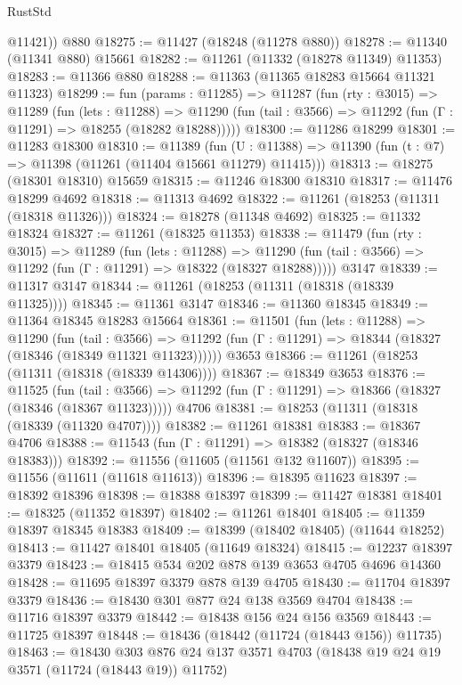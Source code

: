 \begin{lexlean}{RustStd}
\begin{coremodule}
        @11421))
    @880
@18275 := @11427 (@18248 (@11278 @880))
@18278 := @11340 (@11341 @880) @15661
@18282 := @11261 (@11332 (@18278 @11349) @11353)
@18283 := @11366 @880
@18288 := @11363 (@11365 @18283 @15664 @11321 @11323)
@18299 := fun (params : @11285) =>
  @11287
    (fun (rty : @3015) =>
    @11289
      (fun (lets : @11288) =>
      @11290 (fun (tail : @3566) => @11292 (fun (Γ : @11291) => @18255 (@18282 @18288)))))
@18300 := @11286 @18299
@18301 := @11283 @18300
@18310 := @11389
    (fun (U : @11388) => @11390 (fun (t : @7) => @11398 (@11261 (@11404 @15661 @11279) @11415)))
@18313 := @18275 (@18301 @18310) @15659
@18315 := @11246 @18300 @18310
@18317 := @11476 @18299 @4692
@18318 := @11313 @4692
@18322 := @11261 (@18253 (@11311 (@18318 @11326)))
@18324 := @18278 (@11348 @4692)
@18325 := @11332 @18324
@18327 := @11261 (@18325 @11353)
@18338 := @11479
    (fun (rty : @3015) =>
    @11289
      (fun (lets : @11288) =>
      @11290 (fun (tail : @3566) => @11292 (fun (Γ : @11291) => @18322 (@18327 @18288)))))
    @3147
@18339 := @11317 @3147
@18344 := @11261 (@18253 (@11311 (@18318 (@18339 @11325))))
@18345 := @11361 @3147
@18346 := @11360 @18345
@18349 := @11364 @18345 @18283 @15664
@18361 := @11501
    (fun (lets : @11288) =>
    @11290
      (fun (tail : @3566) =>
      @11292 (fun (Γ : @11291) => @18344 (@18327 (@18346 (@18349 @11321 @11323))))))
    @3653
@18366 := @11261 (@18253 (@11311 (@18318 (@18339 @14306))))
@18367 := @18349 @3653
@18376 := @11525
    (fun (tail : @3566) => @11292 (fun (Γ : @11291) => @18366 (@18327 (@18346 (@18367 @11323)))))
    @4706
@18381 := @18253 (@11311 (@18318 (@18339 (@11320 @4707))))
@18382 := @11261 @18381
@18383 := @18367 @4706
@18388 := @11543 (fun (Γ : @11291) => @18382 (@18327 (@18346 @18383)))
@18392 := @11556 (@11605 (@11561 @132 @11607))
@18395 := @11556 (@11611 (@11618 @11613))
@18396 := @18395 @11623
@18397 := @18392 @18396
@18398 := @18388 @18397
@18399 := @11427 @18381
@18401 := @18325 (@11352 @18397)
@18402 := @11261 @18401
@18405 := @11359 @18397 @18345 @18383
@18409 := @18399 (@18402 @18405) (@11644 @18252)
@18413 := @11427 @18401 @18405 (@11649 @18324)
@18415 := @12237 @18397 @3379
@18423 := @18415 @534 @202 @878 @139 @3653 @4705 @4696 @14360
@18428 := @11695 @18397 @3379 @878 @139 @4705
@18430 := @11704 @18397 @3379
@18436 := @18430 @301 @877 @24 @138 @3569 @4704
@18438 := @11716 @18397 @3379
@18442 := @18438 @156 @24 @156 @3569
@18443 := @11725 @18397
@18448 := @18436 (@18442 (@11724 (@18443 @156)) @11735)
@18463 := @18430
    @303
    @876
    @24
    @137
    @3571
    @4703
    (@18438 @19 @24 @19 @3571 (@11724 (@18443 @19)) @11752)

\end{coremodule}
\end{lexlean}
